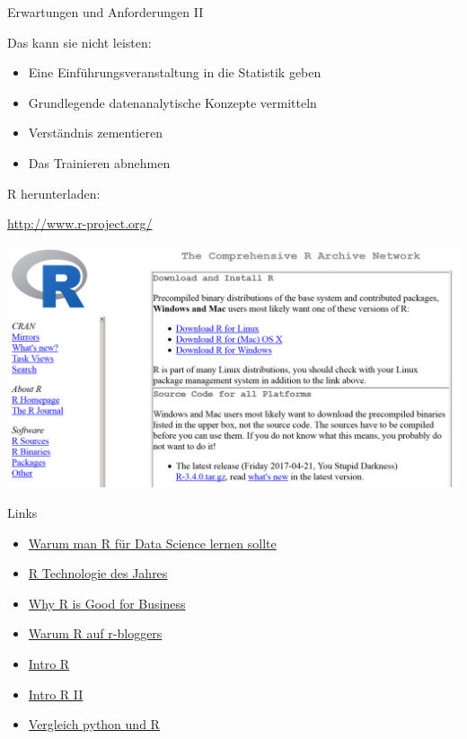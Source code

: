 \documentclass[
  ignorenonframetext,
]{beamer}
\providecommand{\tightlist}{%
  \setlength{\itemsep}{0pt}\setlength{\parskip}{0pt}}
\begin{document}
\begin{frame}{Erwartungen und Anforderungen II}
\protect\hypertarget{erwartungen-und-anforderungen-ii}{}

Das kann sie nicht leisten:

\begin{itemize}
\tightlist
\item
  Eine Einführungsveranstaltung in die Statistik geben
\item
  Grundlegende datenanalytische Konzepte vermitteln
\item
  Verständnis zementieren
\item
  Das Trainieren abnehmen
\end{itemize}

\end{frame}

\begin{frame}{R herunterladen:}
\protect\hypertarget{r-herunterladen}{}

\url{http://www.r-project.org/}

\includegraphics{figure/CRAN1picture.PNG}

\end{frame}

\begin{frame}{Links}
\protect\hypertarget{links}{}

\begin{itemize}
\item
  \href{http://www.r-bloggers.com/why-you-should-learn-r-first-for-data-science/}{Warum
  man R für Data Science lernen sollte}
\item
  \href{http://www.r-bloggers.com/rstudio-infoworld-2015-technology-of-the-year-award-recipient/}{R
  Technologie des Jahres}
\item
  \href{http://www.fastcolabs.com/3030063/why-the-r-programming-language-is-good-for-business}{Why
  R is Good for Business}
\item
  \href{http://www.r-bloggers.com/why-use-r/}{Warum R auf r-bloggers}
\item
  \href{http://www.ats.ucla.edu/stat/r/seminars/intro.htm}{Intro R}
\item
  \href{http://www.ats.ucla.edu/stat/r/sk/}{Intro R II}
\item
  \href{http://www.dataschool.io/python-or-r-for-data-science/}{Vergleich
  python und R}
\end{itemize}

\end{frame}
\end{document}
